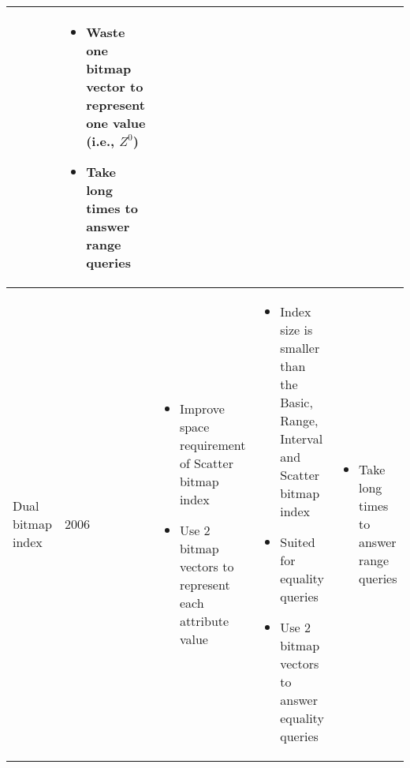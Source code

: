 \documentclass[../main/thesis.tex]{subfiles}
\begin{document}
\begin{landscape}
\begin{longtable}{K{0.12\textwidth}K{0.06\textwidth}K{0.42\textwidth}K{0.42\textwidth}K{0.42\textwidth}}
\begin{minipage}[t]{0.42\textwidth}
		\end{minipage} &
		\begin{minipage}[t]{0.42\textwidth}
			\begin{itemize}[label=-, leftmargin=0.5cm, noitemsep]
				\item Waste one bitmap vector to represent one value (i.e., $Z^0$)
				\item Take long times to answer range queries
			\end{itemize}
		\end{minipage} \\
		\hline
		Dual bitmap index \cite{ScatterBI} & 2006 & 
		\begin{minipage}[t]{0.42\textwidth}
			\begin{itemize}[label=-, leftmargin=0.5cm, noitemsep]
				\item Improve space requirement of Scatter bitmap index
				\item Use 2 bitmap vectors to represent each attribute value
			\end{itemize}
		\end{minipage} &
		\begin{minipage}[t]{0.42\textwidth}
			\begin{itemize}[label=-, leftmargin=0.5cm, noitemsep]
				\item Index size is smaller than the Basic, Range, Interval and Scatter bitmap index
				\item Suited for equality queries
				\item Use 2 bitmap vectors to answer equality queries
			\end{itemize}
		\end{minipage} &
		\begin{minipage}[t]{0.42\textwidth}
			\begin{itemize}[label=-, leftmargin=0.5cm, noitemsep]
				\item Take long times to answer range queries
			\end{itemize}
		\end{minipage} \\
		\hline
	\end{longtable}
\end{landscape}
\end{document}

